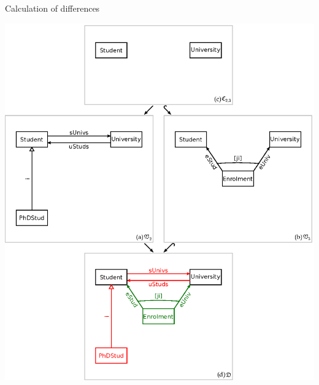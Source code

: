 \documentclass[dvips,slidetop,mathserif,brown]{beamer}
\begin{document}
\begin{frame}{Calculation of differences}
  \begin{center}
    \includegraphics[scale=0.4]{ex_project_vc_standard_diff}
  \end{center}
\end{frame}
\end{document}
